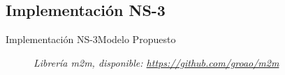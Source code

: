 \subsection{Implementación NS-3}
\begin{frame}{Implementación NS-3}{Modelo Propuesto}	
    \begin{figure}				
		\caption{\small \sl Librería m2m, disponible: \url{https://github.com/groao/m2m}\\}
		\label{figure:ImplementacionNS3}
    \end{figure}
\end{frame}
